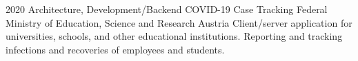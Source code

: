 \cventry
{2020}
{Architecture, Development/Backend}
{COVID-19 Case Tracking}
{Federal Ministry of Education, Science and Research}
{Austria}
{
  Client/server application for universities, schools, and other
  educational institutions. Reporting and tracking infections
  and recoveries of employees and students.
}
